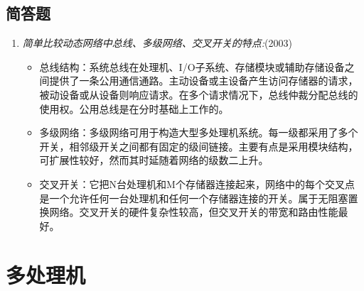 \documentclass[a4paper]{ctexart}
\begin{document}
\subsection{简答题}
\begin{enumerate}
  \item \emph{简单比较动态网络中总线、多级网络、交叉开关的特点:}(2003)
  \begin{itemize}
    \item 总线结构：系统总线在处理机、I/O子系统、存储模块或辅助存储设备之间提供了一条公用通信通路。主动设备或主设备产生访问存储器的请求，被动设备或从设备则响应请求。在多个请求情况下，总线仲裁分配总线的使用权。公用总线是在分时基础上工作的。
    \item 多级网络：多级网络可用于构造大型多处理机系统。每一级都采用了多个开关，相邻级开关之间都有固定的级间链接。主要有点是采用模块结构，可扩展性较好，然而其时延随着网络的级数二上升。
    \item 交叉开关：它把N台处理机和M个存储器连接起来，网络中的每个交叉点是一个允许任何一台处理机和任何一个存储器连接的开关。属于无阻塞置换网络。交叉开关的硬件复杂性较高，但交叉开关的带宽和路由性能最好。
  \end{itemize}
  
\end{enumerate}

\newpage
\section{多处理机}
\end{document}
